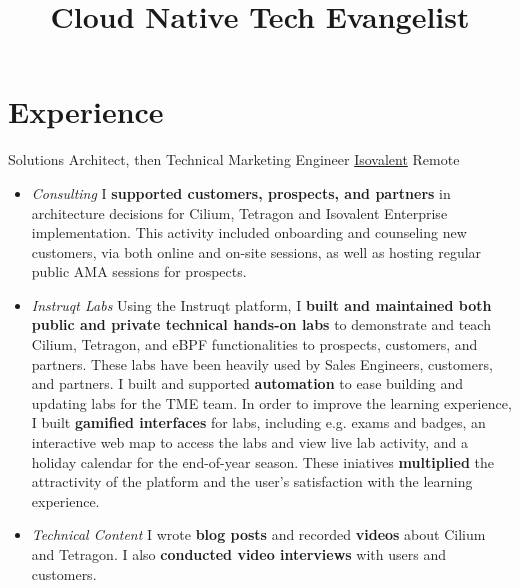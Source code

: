 \documentclass[11pt,a4paper,nolmodern]{moderncv}
\title{Cloud Native Tech Evangelist}
\begin{document}
\setmainfont{Minion Pro}
\setsansfont{Myriad Pro}

\maketitle


\section{Experience}

          {Solutions Architect, then Technical Marketing Engineer}
          {\href{https://isovalent.com}{Isovalent}}
          {Remote}
          {}
          {
  \begin{itemize}
    \item \emph{Consulting}\newline
      I \textbf{supported customers, prospects, and partners} in architecture decisions for 
      Cilium, Tetragon and Isovalent Enterprise implementation.\newline
      This activity included onboarding and counseling new customers, via both online and on-site sessions,
      as well as hosting regular public AMA sessions for prospects.
    \item \emph{Instruqt Labs}\newline
      Using the Instruqt platform, I \textbf{built and maintained both public and private
      technical hands-on labs} to demonstrate and teach Cilium, Tetragon, and eBPF
      functionalities to prospects, customers, and partners.\newline
      These labs have been heavily used by Sales Engineers, customers, and partners.
      I built and supported \textbf{automation} to ease building and updating labs for the TME team.\newline
      In order to improve the learning experience, I built \textbf{gamified interfaces} for labs,
      including e.g. exams and badges, an interactive web map to access the labs and view live lab activity,
      and a holiday calendar for the end-of-year season.\newline
      These iniatives \textbf{multiplied}
      the attractivity of the platform and the user's satisfaction with the learning experience.
    \item \emph{Technical Content}\newline
      I wrote \textbf{blog posts} and recorded \textbf{videos} about Cilium and Tetragon.
      I also \textbf{conducted video interviews} with users and customers.

\end{itemize}}
\end{document}
